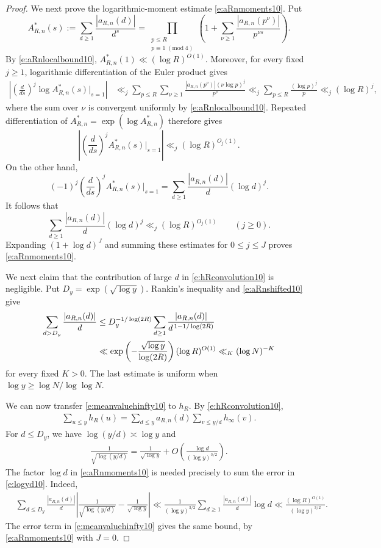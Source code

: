 \documentclass[12pt,reqno]{amsart}
\numberwithin{equation}{section}
\theoremstyle{definition}
\theoremstyle{remark}
\begin{document}
\begin{proof}
We next prove the logarithmic-moment estimate
\eqref{e:aRnmoments10}.  Put
\[
 A_{R,n}^{*}(s)
 :=
 \sum_{d\geq1}\frac{|a_{R,n}(d)|}{d^s}
 =
 \prod_{\substack{p\leq R\\p\equiv1\;(\mathrm{mod}\;4)}}
 \left(
 1+\sum_{\nu\geq1}
 \frac{|a_{R,n}(p^\nu)|}{p^{\nu s}}
 \right).
\]
By \eqref{e:aRnlocalbound10}, $ A_{R,n}^{*}(1)\ll(\log R)^{O(1)}.$
Moreover, for every fixed \(j\geq1\), logarithmic
differentiation of the Euler product gives
\begin{align*}
 \left|
 \left(\frac{d}{ds}\right)^j
 \log A_{R,n}^{*}(s)\bigg|_{s=1}
 \right|
 &\ll_j
 \sum_{p\leq R}\sum_{\nu\geq1}
 \frac{|a_{R,n}(p^\nu)|
       (\nu\log p)^j}{p^\nu}\ll_j
 \sum_{p\leq R}\frac{(\log p)^j}{p}
 \ll_j(\log R)^j,
\end{align*}
where the sum over \(\nu\) is convergent uniformly by
\eqref{e:aRnlocalbound10}.  Repeated differentiation of
\(A_{R,n}^{*}=\exp(\log A_{R,n}^{*})\) therefore gives
\[
 \left|
 \left(\frac{d}{ds}\right)^j
 A_{R,n}^{*}(s)\bigg|_{s=1}
 \right|
 \ll_j(\log R)^{O_j(1)}.
\]
On the other hand,
\[
 (-1)^j
 \left(\frac{d}{ds}\right)^j
 A_{R,n}^{*}(s)\bigg|_{s=1}
 =
 \sum_{d\geq1}
 \frac{|a_{R,n}(d)|}{d}(\log d)^j.
\]
It follows that
\[
 \sum_{d\geq1}
 \frac{|a_{R,n}(d)|}{d}(\log d)^j
 \ll_j(\log R)^{O_j(1)}
 \qquad (j\geq0).
\]
Expanding \((1+\log d)^J\) and summing these estimates for
\(0\leq j\leq J\) proves \eqref{e:aRnmoments10}.

We next claim that the contribution of large \(d\) in
\eqref{e:hRconvolution10} is negligible.  Put $D_y=\exp(\sqrt{\log y}).$
Rankin's inequality and \eqref{e:aRnshifted10} give
\begin{align}\label{e:aRntail10}
 \sum_{d>D_y}\frac{|a_{R,n}(d)|}{d}
 &\leq
 D_y^{-1/\log(2R)}
 \sum_{d\geq1}
 \frac{|a_{R,n}(d)|}
 {d^{\,1-1/\log(2R)}}\notag\\
 &\ll
 \exp\left(
 -\frac{\sqrt{\log y}}{\log(2R)}
 \right)(\log R)^{O(1)}
 \ll_K(\log N)^{-K}
\end{align}
for every fixed \(K>0\).  The last estimate is uniform when
\(\log y\geq\log N/\log\log N\).

We can now transfer \eqref{e:meanvaluehinfty10} to \(h_R\).  By
\eqref{e:hRconvolution10},
\begin{align}\label{e:hRconvolutionsum10}
 \sum_{u\leq y}h_R(u)
 =
 \sum_{d\leq y}a_{R,n}(d)
 \sum_{v\leq y/d}h_\infty(v).
\end{align}
For \(d\leq D_y\), we have $\log(y/d)\asymp\log y$
and
\begin{align}\label{e:logyd10}
 \frac1{\sqrt{\log(y/d)}}
 =
 \frac1{\sqrt{\log y}}
 +O\left(\frac{\log d}{(\log y)^{3/2}}\right).
\end{align}
The factor \(\log d\) in \eqref{e:aRnmoments10} is needed precisely
to sum the error in \eqref{e:logyd10}.  Indeed,
\begin{align*}
 &\sum_{d\leq D_y}\frac{|a_{R,n}(d)|}{d}
 \left|
 \frac1{\sqrt{\log(y/d)}}-
 \frac1{\sqrt{\log y}}
 \right|\ll
 \frac1{(\log y)^{3/2}}
 \sum_{d\geq1}\frac{|a_{R,n}(d)|}{d}\log d
 \ll
 \frac{(\log R)^{O(1)}}{(\log y)^{3/2}}.
\end{align*}
The error term in \eqref{e:meanvaluehinfty10} gives the same bound,
by \eqref{e:aRnmoments10} with \(J=0\).


\end{proof}
\end{document}
